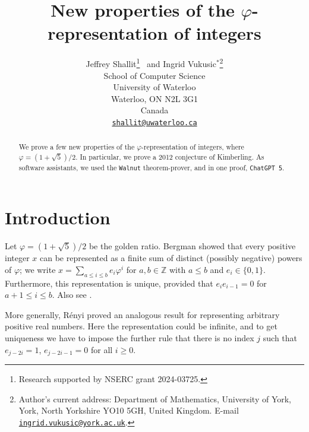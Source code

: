 \documentclass[12pt,reqno]{article}
\title{New properties of the $\varphi$-representation of integers}
\author{Jeffrey Shallit\footnote{Research supported by NSERC grant 2024-03725.} \ and Ingrid Vukusic$^*$\footnote{Author's current address:  Department of Mathematics,
University of York,
York, North Yorkshire YO10 5GH,
United Kingdom.  E-mail
\href{mailto:ingrid.vukusic@york.ac.uk}{\tt ingrid.vukusic@york.ac.uk}.}\\
School of Computer Science\\
University of Waterloo\\
Waterloo, ON N2L 3G1 \\
Canada\\
\href{mailto:shallit@uwaterloo.ca}{\tt shallit@uwaterloo.ca}}
\def\Zee{\mathbb{Z}}
\begin{document}
\maketitle

\theoremstyle{plain}
\newtheorem{theorem}{Theorem}
\newtheorem{corollary}[theorem]{Corollary}
\newtheorem{lemma}[theorem]{Lemma}
\newtheorem{proposition}[theorem]{Proposition}

\theoremstyle{definition}
\newtheorem{definition}[theorem]{Definition}
\newtheorem{example}[theorem]{Example}
\newtheorem{conjecture}[theorem]{Conjecture}

\theoremstyle{remark}
\newtheorem{remark}[theorem]{Remark}




\begin{abstract}
We prove a few new properties of the $\varphi$-representation of integers, where $\varphi = (1+\sqrt{5})/2$.  In particular, we prove a 2012 conjecture of Kimberling.  As software assistants, we used the {\tt Walnut} theorem-prover, and in one proof, {\tt ChatGPT 5}.
\end{abstract}

\section{Introduction}

Let $\varphi = (1+\sqrt{5})/2$ be the golden ratio.  Bergman \cite{Bergman:1957} showed that every positive integer $x$ can be represented as a finite sum of distinct (possibly negative) powers of $\varphi$; we write
$x = \sum_{a \leq i \leq b} e_i \varphi^i$ for $a, b \in \Zee$ with
$a \leq b$ and $e_i \in \{0,1\}$.  Furthermore, this representation is unique, provided that $e_i e_{i-1} = 0$ for $a+1 \leq i\leq b$.  Also see \cite{Rousseau:1995}.

More generally, R\'enyi \cite{Renyi:1957} proved an analogous result for representing arbitrary positive real numbers.   Here the representation could be infinite, and to get uniqueness we have to impose the further rule
that there is no index $j$ such that
    $e_{j-2i} = 1$, $e_{j-2i-1} = 0$ for all $i \geq 0$.
\end{document}
